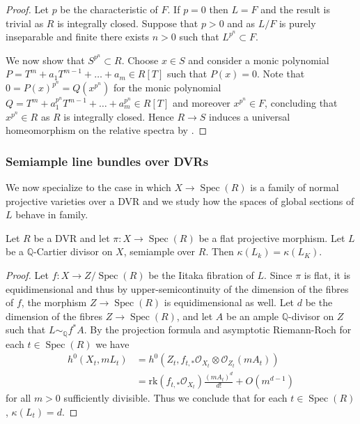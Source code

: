 \documentclass[a4paper,12pt]{book}
\DeclareMathOperator{\Spec}{Spec}
\newcommand{\bQ}{\mathbb{Q}}
\newcommand{\cO}{\mathcal{O}}
\begin{document}
	\begin{proof}
		Let $p$ be the characteristic of $F$. If $p=0$ then $L=F$ and the result is trivial as $R$ is integrally closed.
		Suppose that $p>0$ and as $L/F$ is purely inseparable and finite there exists $n>0$ such that $L^{p^n }\subset F$.
		
		We now show that $S^{p^n} \subset R$. 
		Choose $x \in S$ and consider a monic polynomial $P=T^m+a_1T^{m-1}+ \dots +a_m \in R[T]$ such that $P(x)=0$.
		Note that $0=P(x)^{p^n}=Q(x^{p^n})$ for the monic polynomial $Q=T^m+a_1^{p^n}T^{m-1}+ \dots +a_m^{p^n} \in R[T]$ and moreover $x^{p^n} \in F$, concluding that $x^{p^n} \in R$ as $R$ is integrally closed. 
		Hence $R \to S$ induces a universal homeomorphism on the relative spectra by \cite[Tag 0BRA]{stacks-project}. 
	\end{proof}
	
	\subsubsection{Semiample line bundles over DVRs}
	We now specialize to the case in which $X\to\Spec (R)$ is a family of normal projective varieties over a DVR and we study how the spaces of global sections of $L$ behave in family.
	
	\begin{lemma}\label{lemma_DIOK}
		Let $R$ be a DVR and let $\pi \colon X\to \Spec (R)$ be a flat projective morphism. 
		Let $L$ be a $\bQ$-Cartier divisor on $X$, semiample over $R$. 
		Then $\kappa(L_k)=\kappa(L_K)$.
	\end{lemma}
	
	\begin{proof}
		Let $f \colon X\to Z/\Spec (R)$ be the Iitaka fibration of $L$. Since $\pi$ is flat, it is equidimensional and thus by upper-semicontinuity of the dimension of the fibres of $f$, the morphism $Z\to\Spec (R)$ is equidimensional as well. Let $d$ be the dimension of the fibres $Z \to \Spec(R)$, and let $A$ be an ample $\bQ$-divisor on $Z$ such that $L\sim_{\bQ}f^\ast A$. By the projection formula and asymptotic Riemann-Roch \cite[Theorem VI.2.15]{k-rat-curves} for each $t \in \Spec(R)$ we have
		\begin{equation*}
			\begin{split}
				h^0(X_t,mL_t)&=h^0(Z_t,f_{t,*} \cO_{X_t}\otimes\cO_{Z_t}(mA_t))\\
				&=\mathrm{rk} (f_{t,*} \cO_{X_t})\frac{(mA_t)^d}{d!}+O(m^{d-1})
			\end{split}
		\end{equation*}
		for all $m> 0$ sufficiently divisible. Thus we conclude that for each $t \in \Spec(R)$, $\kappa(L_t)=d$.
	\end{proof}
	
\end{document}
